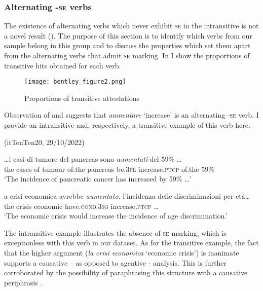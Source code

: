 \documentclass[output=paper,colorlinks,citecolor=brown
]{langscibook}
\begin{document}
\subsubsection{Alternating -\textsc{se} verbs}
\label{bentley_section_3.3.1}
The existence of alternating verbs which never exhibit \textsc{se} in the intransitive is not a novel result (). The purpose of this section is to identify which verbs from our sample belong in this group and to discuss the properties which set them apart from the alternating verbs that admit \textsc{se} marking. In  I show the proportions of transitive hits obtained for each verb.

\begin{figure}[hbt!]
\centering
\texttt{[image: bentley\_figure2.png]}
\caption{\label{fig:bentley_figure_2}Proportions of transitive attestations }
\end{figure}    

Observation of  and  suggests that \textit{aumentare} ‘increase’ is an alternating   -\textsc{se} verb. I provide an intransitive and, respectively, a transitive example of this verb here.

\hspace*{\fill}(itTenTen20, 29/10/2022)\quad

\ea \label{bentley_example_8}
    \gll  \ldots  i casi di tumore del pancreas sono \textit{aumentati} del 59\%  \ldots  \\
    the cases of tumour of.the pancreas be.3\textsc{pl} increase.\textsc{ptcp} of.the 59\% \\
    \glt ‘The incidence of pancreatic cancer has increased by 59\% \ldots ’
\z

\ea \label{bentley_example_9}
    \gll [L]a	crisi		economica	avrebbe 							\textit{aumentato}. {l’incidenza delle discriminazioni per età…} \\
    the		crisis	economic		have.\textsc{cond}.3\textsc{sg}	increase.\textsc{ptcp} \ldots \\
    \glt ‘The economic crisis would increase the incidence of age discrimination.’
\z

The intransitive example illustrates the absence of \textsc{se} marking, which is exceptionless with this verb in our dataset. As for the transitive example, the fact that the higher argument (\textit{la crisi economica} ‘economic crisis’) is inanimate supports a causative – as opposed to agentive - analysis. This is further corroborated by the possibility of paraphrasing this structure with a causative periphrasis \citep[26—27 and references therein]{zribi1987reflexivite}.
\end{document}
